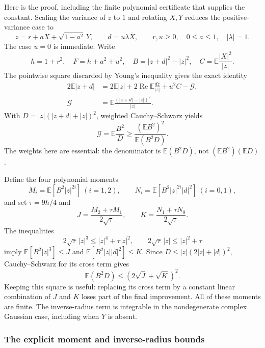 Here is the proof, including the finite polynomial certificate that supplies
the constant.  Scaling the variance of $z$ to $1$ and rotating $X,Y$ reduces
the positive-variance case to
\[
 z=r+aX+\sqrt{1-a^2}\,Y,\qquad d=u\lambda\overline X,
 \qquad r,u\ge0,\quad 0\le a\le1,\quad |\lambda|=1.
\]
The case $u=0$ is immediate.  Write
\[
 h=1+r^2,\quad F=h+a^2+u^2,\quad
 B=|z+d|^2-|z|^2,\quad C=\mathbb E\frac{|X|^2}{|z|}.
\]
The pointwise square discarded by Young's inequality gives the exact identity
\begin{align}
 2\mathbb E|z+d|
 &=2\mathbb E|z|+2\operatorname{Re}\mathbb E\frac{d\overline z}{|z|}
       +u^2C-\mathcal G,\\
 \mathcal G&=\mathbb E\frac{(|z+d|-|z|)^2}{|z|}.
 \label{eq:young-square}
\end{align}
With $D=|z|(|z+d|+|z|)^2$, weighted Cauchy--Schwarz yields
\begin{equation}
 \mathcal G=\mathbb E\frac{B^2}{D}
       \ge\frac{(\mathbb EB^2)^2}{\mathbb E(B^2D)}.
 \label{eq:weighted-square}
\end{equation}
The weights here are essential: the denominator is $\mathbb E(B^2D)$,
not $(\mathbb EB^2)(\mathbb ED)$.

Define the four polynomial moments
\[
 M_i=\mathbb E[B^2|z|^{2i}]\ (i=1,2),\qquad
 N_i=\mathbb E[B^2|z|^{2i}|d|^2]\ (i=0,1),
\]
and set $\tau=9h/4$ and
\[
 J=\frac{M_2+\tau M_1}{2\sqrt\tau},\qquad
 K=\frac{N_1+\tau N_0}{2\sqrt\tau}.
\]
The inequalities
\[
 2\sqrt\tau\,|z|^3\le |z|^4+\tau|z|^2,
 \qquad 2\sqrt\tau\,|z|\le |z|^2+\tau
\]
imply $\mathbb E[B^2|z|^3]\le J$ and
$\mathbb E[B^2|z||d|^2]\le K$.  Since
$D\le |z|(2|z|+|d|)^2$, Cauchy--Schwarz for its cross term gives
\begin{equation}
 \mathbb E(B^2D)\le (2\sqrt J+\sqrt K)^2.
 \label{eq:moment-denominator}
\end{equation}
Keeping this square is useful: replacing its cross term by a constant
linear combination of $J$ and $K$ loses part of the final improvement.
All of these moments are finite.  The inverse-radius term is integrable in
the nondegenerate complex Gaussian case, including when $Y$ is absent.

\subsubsection{The explicit moment and inverse-radius bounds}

